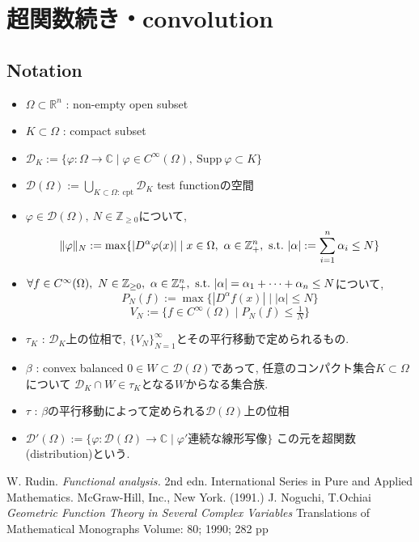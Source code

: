 \chapter{超関数続き・convolution}
\section*{Notation}
\begin{itemize}
    \item \(\Omega \subset \mathbb{R}^n\) : non-empty open subset
    \item \(K \subset \Omega\) : compact subset %
    \item \(\mathcal{D}_K := \{\varphi : \Omega \to \mathbb{C} \mid \varphi \in C^\infty(\Omega), \ \mathrm{Supp} \ \varphi \subset K\}\)
    \item \(\mathcal{D}(\Omega) := \bigcup_{K \subset \Omega: \ \mathrm{cpt}} \mathcal{D}_K\) test functionの空間
    \item \(\varphi \in \mathcal{D}(\Omega), \ N \in \mathbb{Z}_{\ge 0}\)について, 
    \[
    \|\varphi\|_N := \max \{ |D^\alpha \varphi(x)| \mid x \in \Omega, \ \alpha \in \N^n, \ \text{s.t.} \ |\alpha| := \sum_{i=1}^n \alpha_i \le N \}
    \]
    \item \(\forall f \in C^\infty(\Omega), \ N \in \mathbb{Z}_{\ge 0}, \ \alpha \in \mathbb{Z}_+^n, \ \text{s.t.} \ |\alpha| = \alpha_1 + \dots + \alpha_n \le N\)について, 
    \[
    P_N(f) := \max \{ |D^\alpha f(x)| \mid |\alpha| \le N \}
    \]
    \[
    V_N := \{ f \in C^\infty(\Omega) \mid P_N(f) \le \tfrac{1}{N} \}
    \]
    \item \(\tau_K\) : \(\mathcal{D}_K\)上の位相で, \(\{V_N\}_{N=1}^\infty\)とその平行移動で定められるもの. 
    \item \(\beta\) : convex  balanced \(0 \in W \subset \mathcal{D}(\Omega)\)であって, 任意のコンパクト集合$K \subset \Omega$について
    \(\mathcal{D}_K \cap W \in \tau_K\)となる$W$からなる集合族. 
        \item \(\tau\) : \(\beta\)の平行移動によって定められる\(\mathcal{D}(\Omega)\)上の位相
    \item \(\mathcal{D}'(\Omega) := \{ \varphi : \mathcal{D}(\Omega) \to \mathbb{C} \mid \varphi' \text{連続な線形写像} \}\) この元を超関数(distribution)という. 
\end{itemize}

\begin{thebibliography}{n}
W. Rudin. \textit{Functional analysis.} 2nd edn. International Series in Pure and Applied Mathematics. McGraw-Hill, Inc., New York. (1991.)
J. Noguchi, T.Ochiai \textit{Geometric Function Theory in Several Complex Variables} Translations of Mathematical Monographs
Volume: 80; 1990; 282 pp
\end{thebibliography}
 
